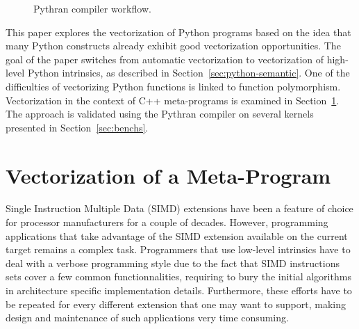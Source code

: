 \documentclass[preprint]{sigplanconf}
\begin{document}
\begin{figure}

\centering
{}

\caption{Pythran compiler workflow.}
\label{fig:pythran-compiler}
\end{figure}


This paper explores the vectorization of Python programs based on the idea that
many Python constructs already exhibit good vectorization opportunities. The
goal of the paper switches from automatic vectorization to vectorization of
high-level Python intrinsics, as described in Section~\ref{sec:python-semantic}.
One of the difficulties of vectorizing Python functions is linked to function
polymorphism. Vectorization in the context of C++ meta-programs is examined in
Section~\ref{sec:meta-vectorization}. The approach is validated using the
Pythran compiler on several kernels presented in Section~\ref{sec:benchs}.

\section{Vectorization of a Meta-Program}
\label{sec:meta-vectorization}

Single Instruction Multiple Data (SIMD) extensions have been a feature of
choice for processor manufacturers for a couple of decades. However,
programming applications that take advantage of the SIMD extension available on
the current target remains a complex task. Programmers that use low-level
intrinsics have to deal with a verbose programming style due to the fact that
SIMD instructions sets cover a few common functionnalities, requiring to bury
the initial algorithms in architecture specific implementation details.
Furthermore, these efforts have to be repeated for every different extension
that one may want to support, making design and maintenance of such
applications very time consuming. 
\end{document}

